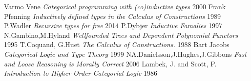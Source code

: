 \documentclass[11pt,oneside]{article}
\begin{document}
\begin{thebibliography}{9}
       Varmo Vene \textit{Categorical programming with (co)inductive types} 2000
   Frank Pfenning \textit{Inductively defined types in the Calculus of Constructions} 1989
  P.Wadler \textit{Recursive types for free} 2014 %
       P.Dybjer \textit{Inductive Famalies} 1997
      N.Gambino,M.Hyland \textit{Wellfounded Trees and Dependent Polynomial Functors} 1995
    T.Coquand, G.Huet \textit{The Calculus of Constructions.} 1988
     Bart Jacobs \textit{Categorical Logic and Type Theory} 1999
        NA.Danielsson,J.Hughes,J.Gibbons \textit{Fast and Loose Reasoning is Morally Correct} 2006
     Lambek, J. and Scott, P.  \textit{Introduction to Higher Order Categorial Logic} 1986
\end{thebibliography}
\end{document}

